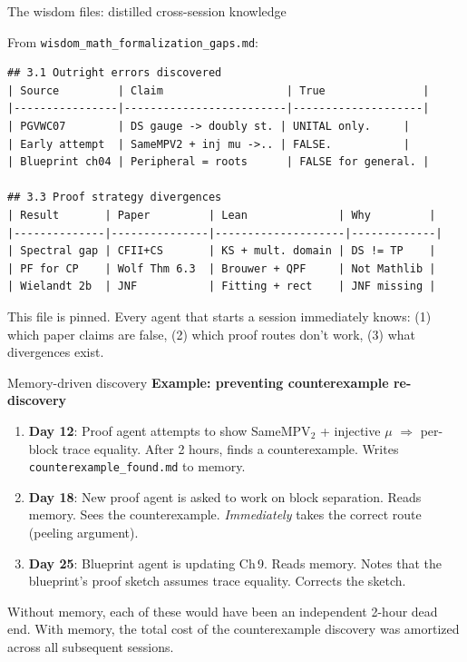 \documentclass[aspectratio=169,10pt]{beamer}
\begin{document}
\begin{frame}[fragile]{The wisdom files: distilled cross-session knowledge}
    \vspace{-0.4em}
    \begin{block}{\footnotesize From \texttt{wisdom\_math\_formalization\_gaps.md}:}
    {\scriptsize\color{dimwhite}
\begin{verbatim}
## 3.1 Outright errors discovered
| Source         | Claim                   | True               |
|----------------|-------------------------|--------------------|
| PGVWC07        | DS gauge -> doubly st. | UNITAL only.     |
| Early attempt  | SameMPV2 + inj mu ->.. | FALSE.           |
| Blueprint ch04 | Peripheral = roots      | FALSE for general. |

## 3.3 Proof strategy divergences
| Result       | Paper         | Lean              | Why         |
|--------------|---------------|--------------------|-------------|
| Spectral gap | CFII+CS       | KS + mult. domain | DS != TP    |
| PF for CP    | Wolf Thm 6.3  | Brouwer + QPF     | Not Mathlib |
| Wielandt 2b  | JNF           | Fitting + rect    | JNF missing |
\end{verbatim}
    }
    \end{block}
    \vspace{0.2em}
    \textcolor{dimwhite}{\footnotesize This file is pinned. Every agent that starts a session immediately knows: (1) which paper claims are false, (2) which proof routes don't work, (3) what divergences exist.}
\end{frame}

\begin{frame}{Memory-driven discovery}
    \vspace{-0.4em}
    \textcolor{leangreen}{\textbf{Example: preventing counterexample re-discovery}}
    \vspace{0.3em}
    \begin{enumerate}
        \item \textbf{Day 12}: Proof agent attempts to show SameMPV$_2$ + injective $\mu$ $\Rightarrow$ per-block trace equality. After 2 hours, finds a counterexample. Writes \texttt{counterexample\_found.md} to memory.
        \item \textbf{Day 18}: New proof agent is asked to work on block separation. Reads memory. Sees the counterexample. \emph{Immediately} takes the correct route (peeling argument).
        \item \textbf{Day 25}: Blueprint agent is updating Ch\,9. Reads memory. Notes that the blueprint's proof sketch assumes trace equality. Corrects the sketch.
    \end{enumerate}
    \vspace{0.3em}
    \textcolor{dimwhite}{\footnotesize Without memory, each of these would have been an independent 2-hour dead end. With memory, the total cost of the counterexample discovery was amortized across all subsequent sessions.}
\end{frame}
\end{document}
